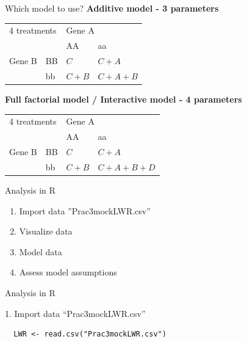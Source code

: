 \documentclass[10pt]{beamer}
\makeatletter
\newenvironment{kframe}{%
 \def\at@end@of@kframe{}%
 \ifinner\ifhmode%
  \def\at@end@of@kframe{\end{minipage}}%
  \begin{minipage}{\columnwidth}%
 \fi\fi%
 \def\FrameCommand##1{\hskip\@totalleftmargin \hskip-\fboxsep
 \colorbox{shadecolor}{##1}\hskip-\fboxsep
     \hskip-\linewidth \hskip-\@totalleftmargin \hskip\columnwidth}%
 \MakeFramed {\advance\hsize-\width
   \@totalleftmargin\z@ \linewidth\hsize
   \@setminipage}}%
 {\par\unskip\endMakeFramed%
 \at@end@of@kframe}
\newenvironment{knitrout}{}{} %
\makeatother
\begin{document}
\begin{frame}{Which model to use?}
 \textbf{Additive model - 3 parameters}
\begin{center}
\begin{tabular}{|l | l | l | l | }
\toprule
  \multicolumn{2}{|l|}{4 treatments} & \multicolumn{2}{l|}{Gene A}\\
  \cmidrule(lr){3-4}
  \multicolumn{2}{|l|}{}  & AA & aa\\
 	    \midrule
      Gene B & BB & $C$ & $C+A$\\
      \cmidrule(lr){3-4}
 	    & bb & $C+B$ & $C+A+B$\\
	    \bottomrule
  \end{tabular}
\end{center}
 

\textbf{Full factorial model / Interactive model - 4 parameters }
\begin{center}
\begin{tabular}{|l | l | l | l | }
\toprule
  \multicolumn{2}{|l|}{4 treatments} & \multicolumn{2}{l|}{Gene A}\\
  \cmidrule(lr){3-4}
  \multicolumn{2}{|l|}{}  & AA & aa\\
 	    \midrule
      Gene B & BB & $C$ & $C+A$\\
      \cmidrule(lr){3-4}
 	    & bb & $C+B$ & $C+A+B+D$\\
	    \bottomrule
  \end{tabular}
\end{center}
\end{frame}

\begin{frame}{Analysis in R}
 
 \begin{enumerate}
  \item Import data ''Prac3mockLWR.csv''
  \item Visualize data
  \item Model data
  \item Assess model assumptions
 \end{enumerate}

\end{frame}

\begin{frame}[fragile]{Analysis in R}
 
 1. Import data ``Prac3mockLWR.csv''
 
 \begin{knitrout}
\color{fgcolor}\begin{kframe}
\begin{verbatim}
  LWR <- read.csv("Prac3mockLWR.csv")
 \end{verbatim}
\end{kframe}
\end{knitrout}
 
\end{frame}
\end{document}
